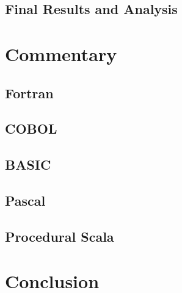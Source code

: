 \documentclass[letterpaper, 10pt, DIV=13]{scrartcl}
\numberwithin{equation}{section}
\numberwithin{figure}{section}
\numberwithin{table}{section}
\begin{document}
\subsection{Final Results and Analysis}

\section{Commentary}
\subsection{Fortran}

\subsection{COBOL}

\subsection{BASIC}

\subsection{Pascal}

\subsection{Procedural Scala}

\section{Conclusion}
\end{document}
